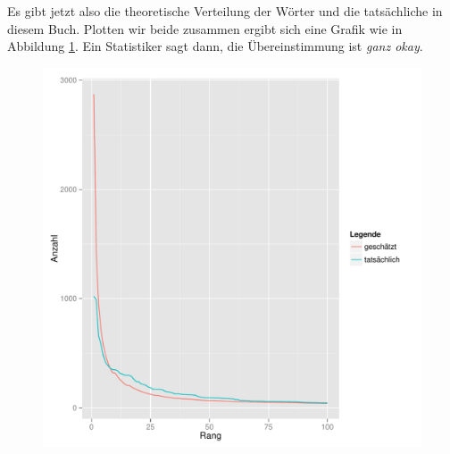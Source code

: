 Es gibt jetzt also die theoretische Verteilung der Wörter und die tatsächliche
in diesem Buch. Plotten wir beide zusammen ergibt sich eine Grafik wie in
Abbildung \ref{dend1}. Ein Statistiker sagt dann, die Übereinstimmung ist \emph{ganz
okay}.

\begin{figure}[ht]
\centering
	\includegraphics[height=.6\textheight,width=\textwidth]{tinaStat/zipfAlle.pdf}
	\label{dend1}
\end{figure}
